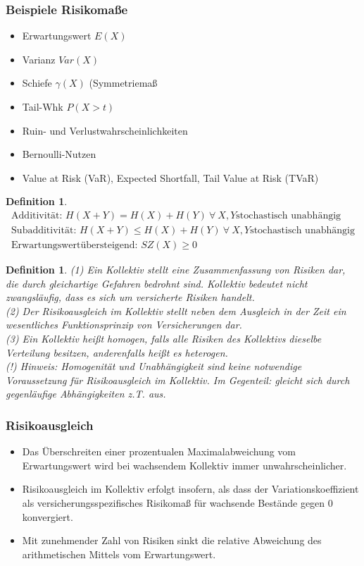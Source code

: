 \documentclass[12pt]{report}
\theoremstyle{dotless}
\newtheorem{defn}[thm]{Definition}
\theoremstyle{definition}
\begin{document}
\subsubsection{Beispiele Risikoma{\ss}e}
\begin{itemize}
	\item Erwartungswert $E(X)$
	\item Varianz $Var(X)$
	\item Schiefe $\gamma(X)$ (Symmetriema{\ss}
	\item Tail-Whk $P(X>t)$
	\item Ruin- und Verlustwahrscheinlichkeiten
	\item Bernoulli-Nutzen
	\item Value at Risk (VaR), Expected Shortfall, Tail Value at Risk (TVaR)
\end{itemize}

\begin{defn}
\begin{align}
	\text{Additivität: } H(X+Y)=H(X)+H(Y) \ \forall \ X,Y \text{stochastisch unabhängig} \\
	\text{Subadditivität: } H(X+Y) \leq H(X)+H(Y) \ \forall \ X,Y \text{stochastisch unabhängig} \\
	\text{Erwartungswertübersteigend: } SZ(X) \geq 0
\end{align}
\end{defn}


\begin{defn}
	(1) Ein Kollektiv stellt eine Zusammenfassung von Risiken dar, die durch gleichartige Gefahren bedrohnt sind. Kollektiv bedeutet nicht zwangsläufig, dass es sich um \textit{versicherte Risiken} handelt. \\
	(2) Der Risikoausgleich im Kollektiv stellt neben dem Ausgleich in der Zeit ein wesentliches Funktionsprinzip von Versicherungen dar. \\
	(3) Ein Kollektiv hei{\ss}t homogen, falls alle Risiken des Kollektivs dieselbe Verteilung besitzen, anderenfalls hei{\ss}t es heterogen. \\
	(!) Hinweis: Homogenität und Unabhängigkeit sind keine notwendige Voraussetzung für Risikoausgleich im Kollektiv. Im Gegenteil: gleicht sich durch gegenläufige Abhängigkeiten z.T. aus.
\end{defn}

\subsubsection{Risikoausgleich}
\begin{itemize}
	\item Das Überschreiten einer prozentualen Maximalabweichung vom Erwartungswert wird bei wachsendem Kollektiv immer unwahrscheinlicher.
	\item Risikoausgleich im Kollektiv erfolgt insofern, als dass der Variationskoeffizient als versicherungsspezifisches Risikoma{\ss} für wachsende Bestände gegen 0 konvergiert.
	\item Mit zunehmender Zahl von Risiken sinkt die relative Abweichung des arithmetischen Mittels vom Erwartungswert.
\end{itemize}
\end{document}
